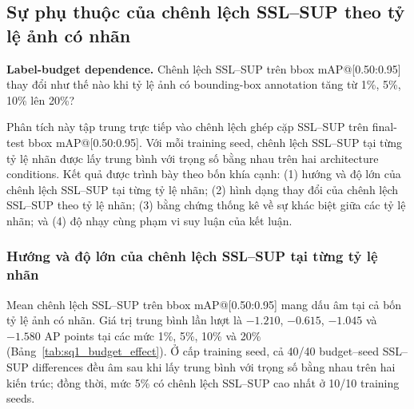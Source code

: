 \documentclass[pdflatex,sn-mathphys-num]{sn-jnl}%
\theoremstyle{thmstyleone}%
\theoremstyle{thmstyletwo}%
\theoremstyle{thmstylethree}%
\begin{document}
\subsection{Sự phụ thuộc của chênh lệch SSL--SUP theo tỷ lệ ảnh có nhãn}

\textbf{Label-budget dependence.} Chênh lệch SSL--SUP trên bbox mAP@[0.50:0.95] thay đổi như thế nào khi tỷ lệ ảnh có bounding-box annotation tăng từ 1\%, 5\%, 10\% lên 20\%?

Phân tích này tập trung trực tiếp vào chênh lệch ghép cặp SSL--SUP trên final-test bbox mAP@[0.50:0.95]. Với mỗi training seed, chênh lệch SSL--SUP tại từng tỷ lệ nhãn được lấy trung bình với trọng số bằng nhau trên hai architecture conditions. Kết quả được trình bày theo bốn khía cạnh: (1) hướng và độ lớn của chênh lệch SSL--SUP tại từng tỷ lệ nhãn; (2) hình dạng thay đổi của chênh lệch SSL--SUP theo tỷ lệ nhãn; (3) bằng chứng thống kê về sự khác biệt giữa các tỷ lệ nhãn; và (4) độ nhạy cùng phạm vi suy luận của kết luận.

\subsubsection{Hướng và độ lớn của chênh lệch SSL--SUP tại từng tỷ lệ nhãn}

Mean chênh lệch SSL--SUP trên bbox mAP@[0.50:0.95] mang dấu âm tại cả bốn tỷ lệ ảnh có nhãn. Giá trị trung bình lần lượt là $-1.210$, $-0.615$, $-1.045$ và $-1.580$ AP points tại các mức 1\%, 5\%, 10\% và 20\% (Bảng~\ref{tab:sq1_budget_effect}). Ở cấp training seed, cả 40/40 budget--seed SSL--SUP differences đều âm sau khi lấy trung bình với trọng số bằng nhau trên hai kiến trúc; đồng thời, mức 5\% có chênh lệch SSL--SUP cao nhất ở 10/10 training seeds.
\end{document}
